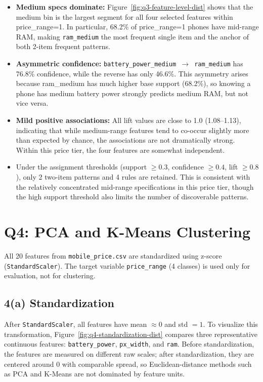 \documentclass[11pt]{article}
\begin{document}
\begin{itemize}
    \item \textbf{Medium specs dominate:} Figure~\ref{fig:q3-feature-level-dist} shows that the medium bin is the largest segment for all four selected features within price\_range=1. In particular, 68.2\% of price\_range=1 phones have mid-range RAM, making \texttt{ram\_medium} the most frequent single item and the anchor of both 2-item frequent patterns.
    \item \textbf{Asymmetric confidence:} \texttt{battery\_power\_medium $\to$ ram\_medium} has 76.8\% confidence, while the reverse has only 46.6\%. This asymmetry arises because ram\_medium has much higher base support (68.2\%), so knowing a phone has medium battery power strongly predicts medium RAM, but not vice versa.
    \item \textbf{Mild positive associations:} All lift values are close to 1.0 (1.08--1.13), indicating that while medium-range features tend to co-occur slightly more than expected by chance, the associations are not dramatically strong. Within this price tier, the four features are somewhat independent.
    \item Under the assignment thresholds (support $\geq 0.3$, confidence $\geq 0.4$, lift $\geq 0.8$), only 2 two-item patterns and 4 rules are retained. This is consistent with the relatively concentrated mid-range specifications in this price tier, though the high support threshold also limits the number of discoverable patterns.
\end{itemize}

\section{Q4: PCA and K-Means Clustering}

All 20 features from \texttt{mobile\_price.csv} are standardized using z-score (\texttt{StandardScaler}). The target variable \texttt{price\_range} (4 classes) is used only for evaluation, not for clustering.

\subsection{4(a) Standardization}

After \texttt{StandardScaler}, all features have mean $\approx 0$ and std $= 1$.
To visualize this transformation, Figure~\ref{fig:q4-standardization-dist} compares three representative continuous features: \texttt{battery\_power}, \texttt{px\_width}, and \texttt{ram}. Before standardization, the features are measured on different raw scales; after standardization, they are centered around 0 with comparable spread, so Euclidean-distance methods such as PCA and K-Means are not dominated by feature units.
\end{document}
